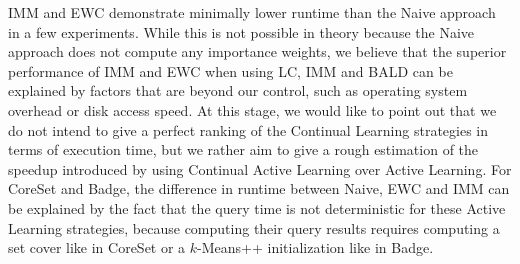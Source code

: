 IMM and EWC demonstrate minimally lower runtime than the Naive approach in a few experiments. While this is not possible in theory because the Naive approach does not compute any importance weights, we believe that the superior performance of IMM and EWC when using LC,
IMM and BALD can be explained by factors that are beyond our control, such as operating system overhead or disk access speed. At this stage, we would like to point out that we do not intend to give a perfect ranking of the Continual Learning strategies in terms of
execution time, but we rather aim to give a rough estimation of the speedup introduced by using Continual Active Learning over Active Learning. For CoreSet and Badge, the difference in runtime between Naive, EWC and IMM can be explained by the fact that the query time
is not deterministic for these Active Learning strategies, because computing their query results requires computing a set cover like in CoreSet or a $k$-Means++ initialization like in Badge. \par



